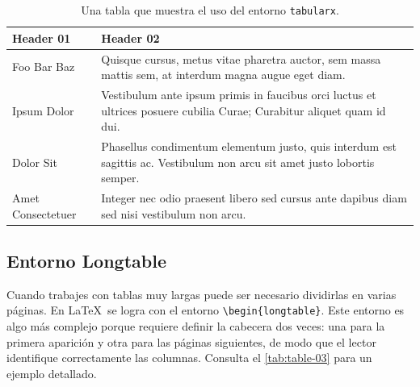 \begin{table}[!htpb]
    \caption{Una tabla que muestra el uso del entorno \texttt{tabularx}.}
    \label{tab:table-02}
    \begin{tabularx}{\textwidth}{lX}
        \toprule
        \textbf{Header 01} & \textbf{Header 02} \\ 
        \midrule
        Foo Bar Baz & Quisque cursus, metus vitae pharetra auctor, sem massa mattis sem, at interdum magna augue eget diam. \\
        Ipsum Dolor & Vestibulum ante ipsum primis in faucibus orci luctus et ultrices posuere cubilia Curae; Curabitur aliquet quam id dui. \\
        Dolor Sit & Phasellus condimentum elementum justo, quis interdum est sagittis ac. Vestibulum non arcu sit amet justo lobortis semper. \\
        Amet Consectetuer & Integer nec odio praesent libero sed cursus ante dapibus diam sed nisi vestibulum non arcu. \\
        \bottomrule
    \end{tabularx}
\end{table}

\subsection{Entorno Longtable}

Cuando trabajes con tablas muy largas puede ser necesario dividirlas en varias páginas. En \LaTeX\ se logra con el entorno \verb|\begin{longtable}|. Este entorno es algo más complejo porque requiere definir la cabecera dos veces: una para la primera aparición y otra para las páginas siguientes, de modo que el lector identifique correctamente las columnas. Consulta el \autoref{tab:table-03} para un ejemplo detallado.

